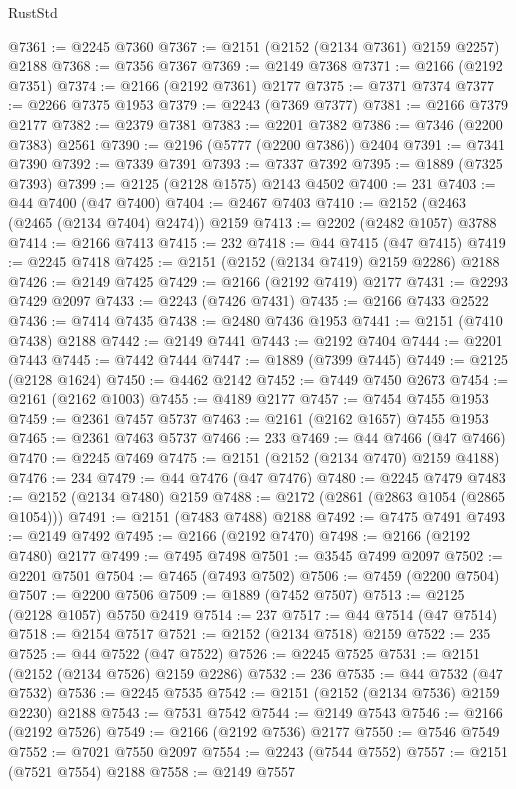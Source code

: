 \begin{lexlean}{RustStd}
\begin{coremodule}
@7361 := @2245 @7360
@7367 := @2151 (@2152 (@2134 @7361) @2159 @2257) @2188
@7368 := @7356 @7367
@7369 := @2149 @7368
@7371 := @2166 (@2192 @7351)
@7374 := @2166 (@2192 @7361) @2177
@7375 := @7371 @7374
@7377 := @2266 @7375 @1953
@7379 := @2243 (@7369 @7377)
@7381 := @2166 @7379 @2177
@7382 := @2379 @7381
@7383 := @2201 @7382
@7386 := @7346 (@2200 @7383) @2561
@7390 := @2196 (@5777 (@2200 @7386)) @2404
@7391 := @7341 @7390
@7392 := @7339 @7391
@7393 := @7337 @7392
@7395 := @1889 (@7325 @7393)
@7399 := @2125 (@2128 @1575) @2143 @4502
@7400 := 231
@7403 := @44 @7400 (@47 @7400)
@7404 := @2467 @7403
@7410 := @2152 (@2463 (@2465 (@2134 @7404) @2474)) @2159
@7413 := @2202 (@2482 @1057) @3788
@7414 := @2166 @7413
@7415 := 232
@7418 := @44 @7415 (@47 @7415)
@7419 := @2245 @7418
@7425 := @2151 (@2152 (@2134 @7419) @2159 @2286) @2188
@7426 := @2149 @7425
@7429 := @2166 (@2192 @7419) @2177
@7431 := @2293 @7429 @2097
@7433 := @2243 (@7426 @7431)
@7435 := @2166 @7433 @2522
@7436 := @7414 @7435
@7438 := @2480 @7436 @1953
@7441 := @2151 (@7410 @7438) @2188
@7442 := @2149 @7441
@7443 := @2192 @7404
@7444 := @2201 @7443
@7445 := @7442 @7444
@7447 := @1889 (@7399 @7445)
@7449 := @2125 (@2128 @1624)
@7450 := @4462 @2142
@7452 := @7449 @7450 @2673
@7454 := @2161 (@2162 @1003)
@7455 := @4189 @2177
@7457 := @7454 @7455 @1953
@7459 := @2361 @7457 @5737
@7463 := @2161 (@2162 @1657) @7455 @1953
@7465 := @2361 @7463 @5737
@7466 := 233
@7469 := @44 @7466 (@47 @7466)
@7470 := @2245 @7469
@7475 := @2151 (@2152 (@2134 @7470) @2159 @4188)
@7476 := 234
@7479 := @44 @7476 (@47 @7476)
@7480 := @2245 @7479
@7483 := @2152 (@2134 @7480) @2159
@7488 := @2172 (@2861 (@2863 @1054 (@2865 @1054)))
@7491 := @2151 (@7483 @7488) @2188
@7492 := @7475 @7491
@7493 := @2149 @7492
@7495 := @2166 (@2192 @7470)
@7498 := @2166 (@2192 @7480) @2177
@7499 := @7495 @7498
@7501 := @3545 @7499 @2097
@7502 := @2201 @7501
@7504 := @7465 (@7493 @7502)
@7506 := @7459 (@2200 @7504)
@7507 := @2200 @7506
@7509 := @1889 (@7452 @7507)
@7513 := @2125 (@2128 @1057) @5750 @2419
@7514 := 237
@7517 := @44 @7514 (@47 @7514)
@7518 := @2154 @7517
@7521 := @2152 (@2134 @7518) @2159
@7522 := 235
@7525 := @44 @7522 (@47 @7522)
@7526 := @2245 @7525
@7531 := @2151 (@2152 (@2134 @7526) @2159 @2286)
@7532 := 236
@7535 := @44 @7532 (@47 @7532)
@7536 := @2245 @7535
@7542 := @2151 (@2152 (@2134 @7536) @2159 @2230) @2188
@7543 := @7531 @7542
@7544 := @2149 @7543
@7546 := @2166 (@2192 @7526)
@7549 := @2166 (@2192 @7536) @2177
@7550 := @7546 @7549
@7552 := @7021 @7550 @2097
@7554 := @2243 (@7544 @7552)
@7557 := @2151 (@7521 @7554) @2188
@7558 := @2149 @7557

\end{coremodule}
\end{lexlean}
